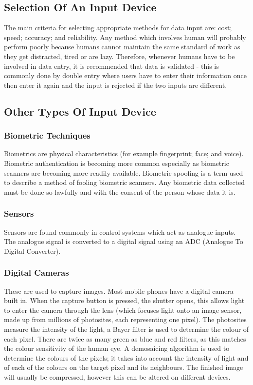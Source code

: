 \documentclass[a4paper,11pt, twocolumn]{article}
\begin{document}
\subsection{Selection Of An Input Device}
The main criteria for selecting appropriate methods for data input are: cost; speed; accuracy; and reliability. Any method which involves human will probably perform poorly because humans cannot maintain the same standard of work as they get distracted, tired or are lazy. Therefore, whenever humans have to be involved in data entry, it is recommended that data is validated - this is commonly done by double entry where users have to enter their information once then enter it again and the input is rejected if the two inputs are different. 
\subsection{Other Types Of Input Device}
\subsubsection{Biometric Techniques}
Biometrics are physical characteristics (for example fingerprint; face; and voice). Biometric authentication is becoming more common especially as biometric scanners are becoming more readily available. Biometric spoofing is a term used to describe a method of fooling biometric scanners. Any biometric data collected must be done so lawfully and with the consent of the person whose data it is.
\subsubsection{Sensors}
Sensors are found commonly in control systems which act as analogue inputs. The analogue signal is converted to a digital signal using an ADC (Analogue To Digital Converter).
\subsubsection{Digital Cameras}
These are used to capture images. Most mobile phones have a digital camera built in. When the capture button is pressed, the shutter opens, this allows light to enter the camera through the lens (which focuses light onto an image sensor, made up from millions of photosites, each representing one pixel). The photosites measure the intensity of the light, a Bayer filter is used to determine the colour of each pixel. There are twice as many green as blue and red filters, as this matches the colour sensitivity of the human eye. A demosaicing algorithm is used to determine the colours of the pixels; it takes into account the intensity of light and of each of the colours on the target pixel and its neighbours. The finished image will usually be compressed, however this can be altered on different devices.
\end{document}
